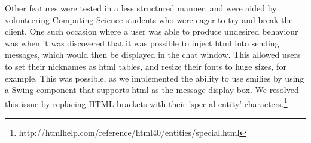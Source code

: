 Other features were tested in a less structured manner, and were aided by volunteering Computing Science students who were eager to try and break the client. One such occasion where a user was able to produce undesired behaviour was when it was discovered that it was possible to inject html into sending messages, which would then be displayed in the chat window. This allowed users to set their nicknames as html tables, and resize their fonts to huge sizes, for example. This was possible, as we implemented the ability to use smilies by using a Swing component that supports html as the message display box. We resolved this issue by replacing HTML brackets with their 'special entity' characters.\footnote{http://htmlhelp.com/reference/html40/entities/special.html} 

